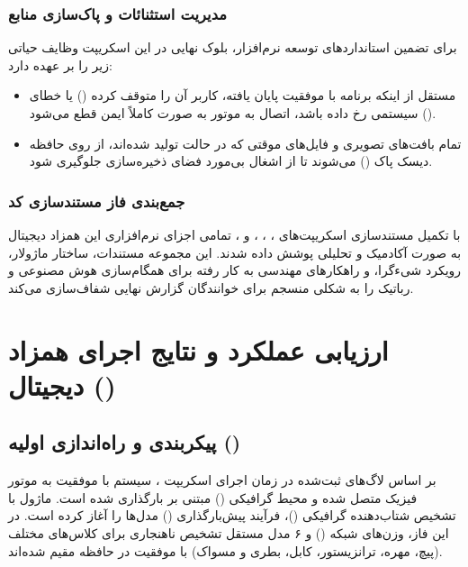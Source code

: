 \documentclass{article}
\begin{document}
\subsubsection{مدیریت استثنائات و پاک‌سازی منابع}
برای تضمین استانداردهای توسعه نرم‌افزار، بلوک نهایی  در این اسکریپت وظایف حیاتی زیر را بر عهده دارد:

\begin{itemize}
	\item مستقل از اینکه برنامه با موفقیت پایان یافته، کاربر آن را متوقف کرده () یا خطای سیستمی رخ داده باشد، اتصال به موتور  به صورت کاملاً ایمن قطع می‌شود ().
	\item تمام بافت‌های تصویری و فایل‌های موقتی که در حالت  تولید شده‌اند، از روی حافظه دیسک پاک () می‌شوند تا از اشغال بی‌مورد فضای ذخیره‌سازی جلوگیری شود.
\end{itemize}

\subsubsection*{جمع‌بندی فاز مستندسازی کد}
با تکمیل مستندسازی اسکریپت‌های ، ، ،  و ، تمامی اجزای نرم‌افزاری این همزاد دیجیتال به صورت آکادمیک و تحلیلی پوشش داده شدند. این مجموعه مستندات، ساختار ماژولار، رویکرد شیءگرا، و راهکارهای مهندسی به کار رفته برای همگام‌سازی هوش مصنوعی و رباتیک را به شکلی منسجم برای خوانندگان گزارش نهایی شفاف‌سازی می‌کند.

\section{ارزیابی عملکرد و نتایج اجرای همزاد دیجیتال ()}

\subsection{پیکربندی و راه‌اندازی اولیه ()}
بر اساس لاگ‌های ثبت‌شده در زمان اجرای اسکریپت ، سیستم با موفقیت به موتور فیزیک  متصل شده و محیط گرافیکی () مبتنی بر  بارگذاری شده است. ماژول  با تشخیص شتاب‌دهنده گرافیکی ()، فرآیند پیش‌بارگذاری () مدل‌ها را آغاز کرده است. در این فاز، وزن‌های شبکه  () و ۶ مدل مستقل تشخیص ناهنجاری  برای کلاس‌های مختلف (پیچ، مهره، ترانزیستور، کابل، بطری و مسواک) با موفقیت در حافظه  مقیم شده‌اند.
\end{document}
